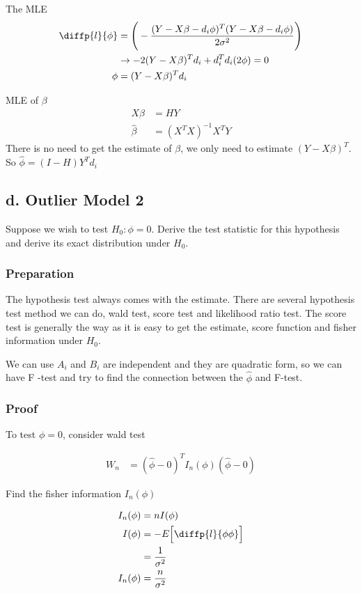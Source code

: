 \documentclass[11pt]{article} %
\begin{document}
The MLE 
\begin{align*}
	\diffp{l}{\phi} & =\Bigg( -\frac{(Y- X\beta -d_i \phi)^T (Y- X\beta -d_i \phi)}{2 \sigma^2}  \Bigg) \\
	&\rightarrow -2(Y-X\beta)^T d_i + d_i^T d_i (2 \phi) = 0 \\
	\phi &= (Y-X\beta)^T d_i
\end{align*}

MLE of $\beta$ 
\begin{align*}
	X\beta & = HY \\
	\hat{\beta} &= (X^TX)^{-1} X^T Y
\end{align*}
There is no need to get the estimate of $\beta$, we only need to estimate  $(Y-X\beta)^T$. 
So $\hat{\phi} = (I-H)Y^T d_i$

\subsection{d. Outlier Model 2}
Suppose we wish to test $H_0 : \phi = 0$. Derive the test statistic for this hypothesis and derive its exact distribution under $H_0$.

\subsubsection{Preparation}

The hypothesis test always comes with the estimate. There are several hypothesis test method we can do, wald test, score test and likelihood ratio test. The score test is generally the way as it is easy to get the estimate, score function and fisher information under $H_0$.

We can use $A_i$ and $B_i$ are independent and they are quadratic form, so we can have F -test and try to find the connection between the $\hat{\phi}$ and F-test.



\subsubsection{Proof}

To test $\phi = 0$, consider wald test

\begin{align*}
	W_n & = (\hat{\phi} - 0)^T I_n (\phi) (\hat{\phi} - 0) 
\end{align*}

Find the fisher information $I_n(\phi)$ 

\begin{align*}
	I_n (\phi)& = n I(\phi) \\
	I(\phi) &= -E \Big[\diffp{l}{\phi \phi} \Big] \\
	&= \frac{1}{\sigma^2}\\
	I_n(\phi) & =\frac{n}{\sigma^2}
\end{align*}
\end{document}
